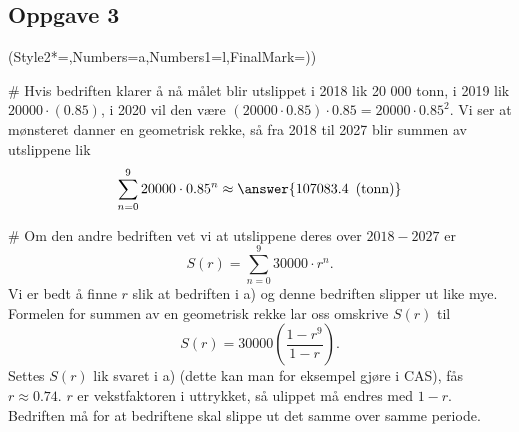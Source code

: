 \subsection*{Oppgave 3}
\begin{easylist}[enumerate]
	\ListProperties(Style2*=,Numbers=a,Numbers1=l,FinalMark={)})

	# Hvis bedriften klarer å nå målet blir utslippet i 2018 lik 20 000 tonn, i 2019 lik $20 000\cdot(0.85)$, i 2020 vil den være $(20000\cdot 0.85)\cdot 0.85 = 20000 \cdot 0.85^2$.
	Vi ser at mønsteret danner en geometrisk rekke, så fra 2018 til 2027 blir summen av utslippene lik
	$$\sum_{n=0}^9 20000\cdot 0.85^n \approx \answer{107083.4 \, \text{ (tonn)}}$$

	#  Om den andre bedriften vet vi at utslippene deres over $2018-2027$ er
	\begin{equation*}
	S(r)=\sum_{n=0}^{9} 30000\cdot r^n.
	\end{equation*}
	Vi er bedt å finne $r$ slik at bedriften i a) og denne bedriften slipper ut like mye.
	Formelen for summen av en geometrisk rekke lar oss omskrive $S(r)$ til
	\begin{equation*}
	S(r)=30000 \left(\frac{1-r^9}{1-r}\right).
	\end{equation*}
	Settes $S(r)$ lik svaret i a) (dette kan man for eksempel gjøre i CAS), fås $r\approx 0.74$. $r$ er vekstfaktoren i uttrykket, så ulippet må endres med $1-r$. Bedriften må  for at bedriftene skal slippe ut det samme over samme periode.
\end{easylist}

